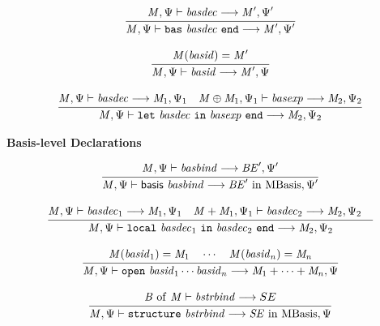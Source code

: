 \documentclass[draft]{article}
\renewcommand{\mit}[1]{\mathit{#1}}
\newcommand{\mrm}[1]{\mathrm{#1}}
\newcommand{\mtt}[1]{\mathtt{#1}}
\newcommand{\msf}[1]{\mathsf{#1}}
\newcommand{\infrule}[2]{{\frac{\displaystyle\strut{#1}}{\displaystyle\strut{#2}}}}
\newcommand{\judge}[2]{\infrule{#1}{#2}}
\begin{document}
\begin{equation}
\judge{
\mit{M}, \Psi \vdash \mit{basdec} \longrightarrow \mit{M}', \Psi'
}{
\mit{M}, \Psi \vdash \mtt{bas}~ \mit{basdec} ~\mtt{end} \longrightarrow \mit{M}', \Psi'
}
\end{equation}

\begin{equation}
\judge{
\mit{M}(\mit{basid}) = \mit{M}'
}{
\mit{M}, \Psi \vdash \mit{basid} \longrightarrow \mit{M}', \Psi
}
\end{equation}

\begin{equation}
\judge{
\mit{M}, \Psi \vdash \mit{basdec} \longrightarrow \mit{M}_1, \Psi_1 \quad
\mit{M} \oplus \mit{M}_1, \Psi_1 \vdash \mit{basexp} \longrightarrow \mit{M}_2, \Psi_2
}{
\mit{M}, \Psi \vdash \mtt{let}~ \mit{basdec} ~\mtt{in}~ \mit{basexp} ~\mtt{end} \longrightarrow \mit{M}_2, \Psi_2
}
\end{equation}

\vspace{2\parsep}
{\large\noindent
\textbf{Basis-level Declarations} \hfill 
\fbox{$\mit{M}, \Psi \vdash \mit{basdec} \longrightarrow \mit{M}', \Psi' / p$}
}\nopagebreak

\begin{equation}
\judge{
\mit{M}, \Psi  \vdash \mit{basbind} \longrightarrow \mit{BE}', \Psi'
}{
\mit{M}, \Psi  \vdash \msf{basis}~ \mit{basbind} \longrightarrow \mit{BE}' ~\mrm{in}~ \mrm{MBasis}, \Psi'
}
\end{equation}

\begin{equation}
\judge{
\mit{M}, \Psi  \vdash \mit{basdec}_1 \longrightarrow \mit{M}_1, \Psi_1 \quad
\mit{M} + \mit{M}_1, \Psi_1  \vdash \mit{basdec}_2 \longrightarrow \mit{M}_2, \Psi_2 \quad
}{
\mit{M}, \Psi  \vdash \mtt{local}~ \mit{basdec}_1 ~\mtt{in}~ \mit{basdec}_2 ~\mtt{end} \longrightarrow \mit{M}_2, \Psi_2
}
\end{equation}

\begin{equation}
\judge{
\mit{M}(\mit{basid}_1) = \mit{M}_1 \quad \cdots \quad
\mit{M}(\mit{basid}_n) = \mit{M}_n 
}{
\mit{M}, \Psi  \vdash \mtt{open}~ \mit{basid}_1 \cdots \mit{basid}_n \longrightarrow \mit{M}_1 + \cdots + \mit{M}_n, \Psi
}
\end{equation}

\begin{equation}
\judge{
\mit{B}~\mrm{of}~\mit{M} \vdash \mit{bstrbind} \longrightarrow SE
}{
\mit{M}, \Psi  \vdash \mtt{structure}~ \mit{bstrbind}
\longrightarrow \mit{SE} ~\mrm{in}~ \mrm{MBasis}, \Psi
}
\end{equation}
\end{document}
